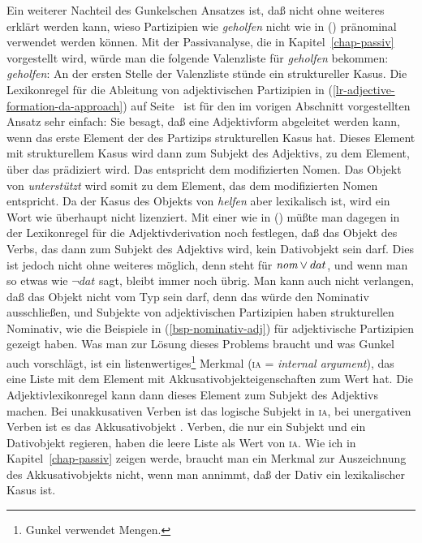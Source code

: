Ein weiterer Nachteil des Gunkelschen Ansatzes ist, daß nicht ohne weiteres erklärt werden kann,
wieso Partizipien wie \emph{geholfen} nicht wie in () pränominal verwendet werden können.
\z
Mit der Passivanalyse, die in Kapitel~\ref{chap-passiv} vorgestellt wird, würde man die
folgende Valenzliste für \emph{geholfen} bekommen:
\ea
\emph{geholfen}: \subcat {}
\z
An der ersten Stelle der Valenzliste stünde ein struktureller Kasus. Die Lexikonregel für die
Ableitung von adjektivischen Partizipien in (\ref{lr-adjective-formation-da-approach}) 
auf Seite~\pageref{lr-adjective-formation-da-approach} ist für den im vorigen Abschnitt vorgestellten
Ansatz sehr einfach: Sie besagt, daß eine Adjektivform abgeleitet werden kann, wenn das
erste Element der \subcatl des Partizips strukturellen Kasus hat. Dieses Element mit strukturellem
Kasus wird dann zum Subjekt des Adjektivs, \dash zu dem Element, über das prädiziert wird.
Das entspricht dem modifizierten Nomen. Das Objekt von \emph{unterstützt} wird somit zu dem
Element, das dem modifizierten Nomen entspricht. Da der Kasus des Objekts von \emph{helfen}
aber lexikalisch ist, wird ein Wort wie  überhaupt nicht lizenziert. Mit einer
\subcatl wie in () müßte man dagegen in der Lexikonregel für die Adjektivderivation
noch festlegen, daß das Objekt des Verbs, das dann zum Subjekt des Adjektivs wird,
kein Dativobjekt sein darf. Dies ist jedoch nicht ohne weiteres möglich, denn 
steht für ${\normalfont\textit{nom}} \vee dat$, und wenn man so etwas wie $\neg dat$ sagt, bleibt immer noch 
übrig. Man kann auch nicht verlangen, daß das Objekt nicht vom Typ  sein darf, denn
das würde den Nominativ ausschließen, und Subjekte von adjektivischen Partizipien haben strukturellen Nominativ,
wie die Beispiele in (\ref{bsp-nominativ-adj}) für adjektivische Partizipien gezeigt haben.
Was man zur Lösung dieses Problems braucht und was Gunkel auch vorschlägt, ist ein listenwertiges\footnote{
  Gunkel verwendet Mengen.%
}
Merkmal (\textsc{ia} = \emph{internal argument}), das eine Liste mit dem Element mit Akkusativobjekteigenschaften zum Wert hat. Die
Adjektivlexikonregel kann dann dieses Element zum Subjekt des Adjektivs machen. Bei unakkusativen
Verben ist das logische Subjekt in \textsc{ia}, bei unergativen Verben ist es das Akkusativobjekt \citep[]{Gunkel2003b}.
Verben, die nur ein Subjekt und ein Dativobjekt regieren, haben die leere Liste als Wert von \textsc{ia}.
Wie ich in Kapitel~\ref{chap-passiv} zeigen werde, braucht man ein Merkmal zur Auszeichnung des
Akkusativobjekts nicht, wenn man annimmt, daß der Dativ ein lexikalischer Kasus ist.


